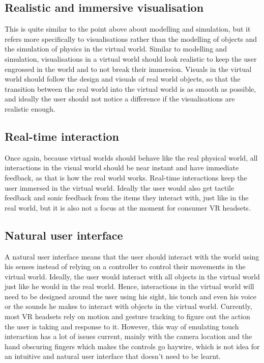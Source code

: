\documentclass[11pt]{article}
\begin{document}
\subsection{Realistic and immersive visualisation}
\label{sec:org390d1dc}
This is quite similar to the point above about modelling and simulation, but it refers more specifically to visualisations rather than the modelling of objects and the simulation of physics in the virtual world. Similar to modelling and simulation, visualisations in a virtual world should look realistic to keep the user engrossed in the world and to not break their immersion. Visuals in the virtual world should follow the design and visuals of real world objects, so that the transition between the real world into the virtual world is as smooth as possible, and ideally the user should not notice a difference if the visualisations are realistic enough.
\subsection{Real-time interaction}
\label{sec:orgaab2bc2}
Once again, because virtual worlds should behave like the real physical world, all interactions in the visual world should be near instant and have immediate feedback, as that is how the real world works. Real-time interactions keep the user immersed in the virtual world. Ideally the user would also get tactile feedback and sonic feedback from the items they interact with, just like in the real world, but it is also not a focus at the moment for consumer VR headsets.
\subsection{Natural user interface}
\label{sec:orgba47636}
A natural user interface means that the user should interact with the world using his senses instead of relying on a controller to control their movements in the virtual world. Ideally, the user would interact with all objects in the virtual world just like he would in the real world. Hence, interactions in the virtual world will need to be designed around the user using his sight, his touch and even his voice or the sounds he makes to interact with objects in the virtual world. Currently, most VR headsets rely on motion and gesture tracking to figure out the action the user is taking and response to it. However, this way of emulating touch interaction has a lot of issues current, mainly with the camera location and the hand obscuring fingers which makes the controls go haywire, which is not idea for an intuitive and natural user interface that doesn't need to be learnt.
\end{document}
